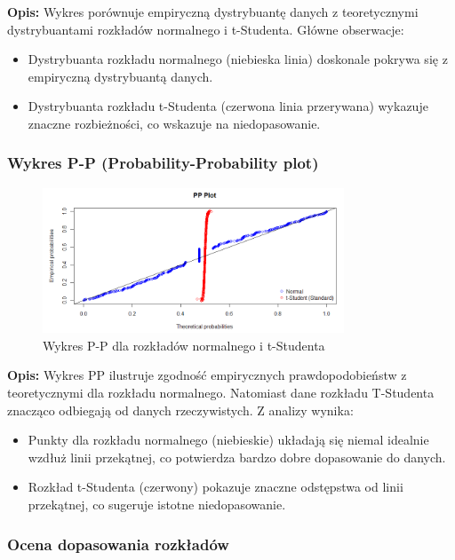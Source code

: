 \documentclass[a4paper,11pt]{article}
\begin{document}
\textbf{Opis:} Wykres porównuje empiryczną dystrybuantę danych z teoretycznymi dystrybuantami rozkładów normalnego i t-Studenta.  
Główne obserwacje:
\begin{itemize}
    \item Dystrybuanta rozkładu normalnego (niebieska linia) doskonale pokrywa się z empiryczną dystrybuantą danych.
    \item Dystrybuanta rozkładu t-Studenta (czerwona linia przerywana) wykazuje znaczne rozbieżności, co wskazuje na niedopasowanie.
\end{itemize}

\subsubsection{Wykres P-P (Probability-Probability plot)}

\begin{figure}[H]
    \centering
    \includegraphics[width=0.8\textwidth]{./Wojtek/wykres-pp.png}
    \caption{Wykres P-P dla rozkładów normalnego i t-Studenta}
    \label{fig:pp_plot}
\end{figure}

\textbf{Opis:} Wykres PP ilustruje zgodność empirycznych prawdopodobieństw z teoretycznymi dla rozkładu normalnego. Natomiast dane rozkładu T-Studenta znacząco odbiegają od danych rzeczywistych.  
Z analizy wynika:
\begin{itemize}
    \item Punkty dla rozkładu normalnego (niebieskie) układają się niemal idealnie wzdłuż linii przekątnej, co potwierdza bardzo dobre dopasowanie do danych.
    \item Rozkład t-Studenta (czerwony) pokazuje znaczne odstępstwa od linii przekątnej, co sugeruje istotne niedopasowanie.
\end{itemize}

\subsubsection{Ocena dopasowania rozkładów}
\end{document}
